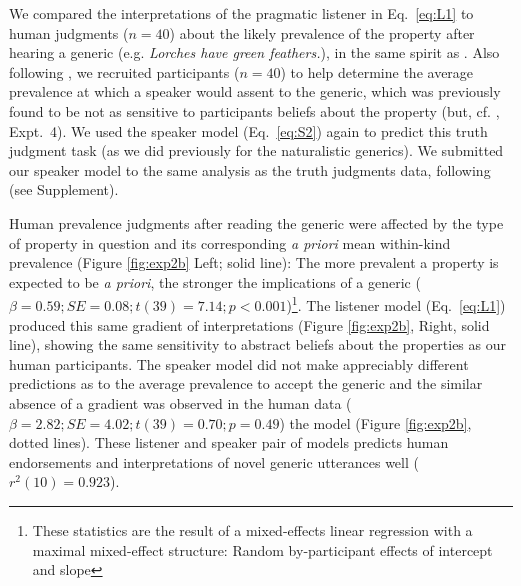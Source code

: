 \documentclass[10pt,letterpaper]{article}
\begin{document}
We compared the interpretations of the pragmatic listener in Eq.~\ref{eq:L1} to human judgments ($n=40$) about the likely prevalence of the property after hearing a generic (e.g. \emph{Lorches have green feathers.}), in the same spirit as . 
Also following , we recruited participants ($n=40$) to help determine the average prevalence at which a speaker would assent to the generic, which was previously found to be not as sensitive to participants beliefs about the property (but, cf. , Expt.~4).
We used the speaker model (Eq.~\ref{eq:S2}) again to predict this truth judgment task (as we did previously for the naturalistic generics).
We submitted our speaker model to the same analysis as the truth judgments data, following  (see Supplement). 

Human prevalence judgments after reading the generic were affected by the type of property in question and its corresponding \emph{a priori} mean within-kind prevalence (Figure \ref{fig:exp2b} Left; solid line): The more prevalent a property is expected to be \emph{a priori}, the stronger the implications of a generic ($\beta = 0.59; SE = 0.08; t(39) = 7.14; p < 0.001$)\footnote{These statistics are the result of a mixed-effects linear regression with a maximal mixed-effect structure: Random by-participant effects of intercept and slope}. 
The listener model (Eq.~\ref{eq:L1}) produced this same gradient of interpretations (Figure \ref{fig:exp2b}, Right, solid line), showing the same sensitivity to abstract beliefs about the properties as our human participants. 
The speaker model did not make appreciably different predictions as to the average prevalence to accept the generic  and the similar absence of a gradient was observed in the human data ($\beta = 2.82; SE = 4.02; t(39) = 0.70; p = 0.49$) the model (Figure \ref{fig:exp2b}, dotted lines). 
These listener and speaker pair of models predicts human endorsements and interpretations of novel generic utterances well ($r^2(10) = 0.923$). 

\end{document}
